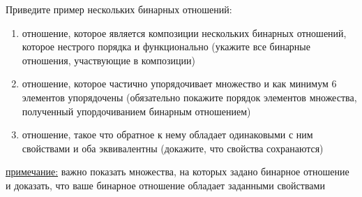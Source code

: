 \question
Приведите  пример  нескольких бинарных отношений:
\begin{enumerate}
	\renewcommand{\labelenumi}{\alph{enumi})}
	\item отношение, которое является композиции нескольких бинарных отношений,  которое  нестрого порядка и функционально (укажите все бинарные отношения, участвующие в композиции)
	\item отношение, которое частично упорядочивает множество и как минимум 6 элементов упорядочены (обязательно покажите порядок элементов множества, полученный упордочиванием бинарным отношением)
	\item отношение, такое что обратное к нему  обладает одинаковыми с ним свойствами и оба эквивалентны (докажите, что свойства сохранаются)
\end{enumerate}

\underline{примечание:} важно показать  множества, на которых задано бинарное отношение и доказать, что ваше бинарное отношение обладает заданными свойствами
